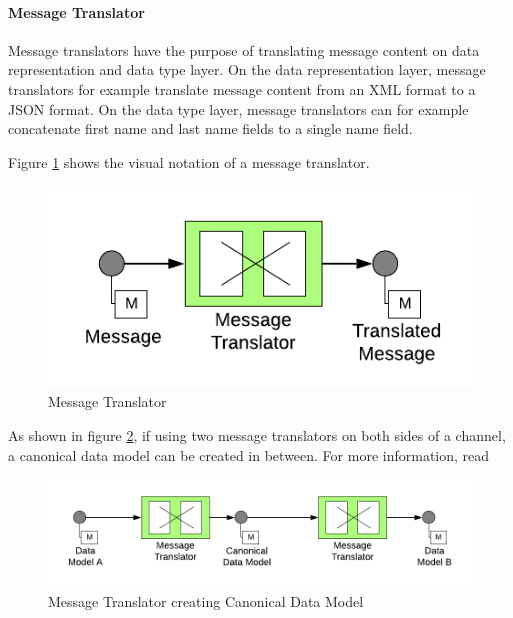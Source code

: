 \paragraph{Message Translator}

Message translators have the purpose of translating message content on data representation and data type layer.
On the data representation layer, message translators for example translate message content from an XML format to a JSON format. On the data type layer, message translators can for example concatenate first name and last name fields to a single name field.

Figure \ref{messaging:translator1} shows the visual notation of a message translator.

\begin{figure}[H]
    \centering
    \includegraphics[scale=0.6]{Diagrams/Messaging/6. Message Translator.pdf}
    \caption{Message Translator}
    \label{messaging:translator1}
\end{figure}

As shown in figure \ref{messaging:translator2}, if using two message translators on both sides of a channel, a canonical data model can be created in between. For more information, read \textcite[p. 355]{EIP}

\begin{figure}[H]
    \centering
    \includegraphics[scale=0.6]{Diagrams/Messaging/7. Message Translator.pdf}
    \caption{Message Translator creating Canonical Data Model}
    \label{messaging:translator2}
\end{figure}

